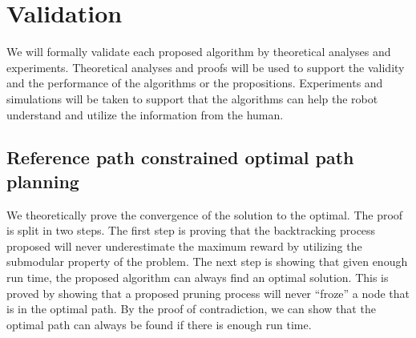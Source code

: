 \documentclass[phd]{byuprop}
\begin{document}

\section{Validation}

We will formally validate each proposed algorithm by theoretical analyses and experiments.
Theoretical analyses and proofs will be used to support the validity and the performance of the algorithms or the propositions.
Experiments and simulations will be taken to support that the algorithms can help the robot understand and utilize the information from the human.

\subsection{Reference path constrained optimal path planning}

We theoretically prove the convergence of the solution to the optimal.
The proof is split in two steps.
The first step is proving that the backtracking process proposed will never underestimate the maximum reward by utilizing the submodular property of the problem.
The next step is showing that given enough run time, the proposed algorithm can always find an optimal solution.
This is proved by showing that a proposed pruning process will never ``froze'' a node that is in the optimal path.
By the proof of contradiction, we can show that the optimal path can always be found if there is enough run time.
\end{document}
